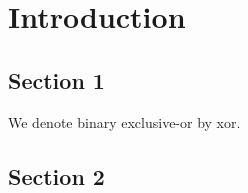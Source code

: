 \chapter{Introduction}
\section{Section 1}
We denote binary exclusive-or by \gls{xor}.

\lipsum

\section{Section 2}
\lipsum
